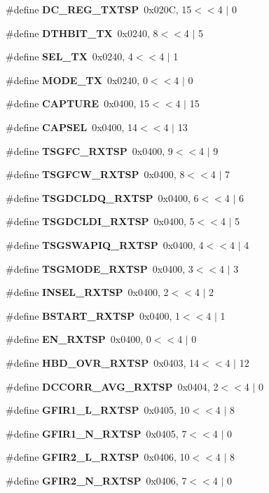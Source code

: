 \begin{DoxyCompactItemize}
\item 
\#define {\bf D\+C\+\_\+\+R\+E\+G\+\_\+\+T\+X\+T\+SP}~0x020\+C, 15$<$$<$4 $\vert$  0
\item 
\#define {\bf D\+T\+H\+B\+I\+T\+\_\+\+TX}~0x0240, 8$<$$<$4 $\vert$  5
\item 
\#define {\bf S\+E\+L\+\_\+\+TX}~0x0240, 4$<$$<$4 $\vert$  1
\item 
\#define {\bf M\+O\+D\+E\+\_\+\+TX}~0x0240, 0$<$$<$4 $\vert$  0
\item 
\#define {\bf C\+A\+P\+T\+U\+RE}~0x0400, 15$<$$<$4 $\vert$  15
\item 
\#define {\bf C\+A\+P\+S\+EL}~0x0400, 14$<$$<$4 $\vert$  13
\item 
\#define {\bf T\+S\+G\+F\+C\+\_\+\+R\+X\+T\+SP}~0x0400, 9$<$$<$4 $\vert$  9
\item 
\#define {\bf T\+S\+G\+F\+C\+W\+\_\+\+R\+X\+T\+SP}~0x0400, 8$<$$<$4 $\vert$  7
\item 
\#define {\bf T\+S\+G\+D\+C\+L\+D\+Q\+\_\+\+R\+X\+T\+SP}~0x0400, 6$<$$<$4 $\vert$  6
\item 
\#define {\bf T\+S\+G\+D\+C\+L\+D\+I\+\_\+\+R\+X\+T\+SP}~0x0400, 5$<$$<$4 $\vert$  5
\item 
\#define {\bf T\+S\+G\+S\+W\+A\+P\+I\+Q\+\_\+\+R\+X\+T\+SP}~0x0400, 4$<$$<$4 $\vert$  4
\item 
\#define {\bf T\+S\+G\+M\+O\+D\+E\+\_\+\+R\+X\+T\+SP}~0x0400, 3$<$$<$4 $\vert$  3
\item 
\#define {\bf I\+N\+S\+E\+L\+\_\+\+R\+X\+T\+SP}~0x0400, 2$<$$<$4 $\vert$  2
\item 
\#define {\bf B\+S\+T\+A\+R\+T\+\_\+\+R\+X\+T\+SP}~0x0400, 1$<$$<$4 $\vert$  1
\item 
\#define {\bf E\+N\+\_\+\+R\+X\+T\+SP}~0x0400, 0$<$$<$4 $\vert$  0
\item 
\#define {\bf H\+B\+D\+\_\+\+O\+V\+R\+\_\+\+R\+X\+T\+SP}~0x0403, 14$<$$<$4 $\vert$  12
\item 
\#define {\bf D\+C\+C\+O\+R\+R\+\_\+\+A\+V\+G\+\_\+\+R\+X\+T\+SP}~0x0404, 2$<$$<$4 $\vert$  0
\item 
\#define {\bf G\+F\+I\+R1\+\_\+\+L\+\_\+\+R\+X\+T\+SP}~0x0405, 10$<$$<$4 $\vert$  8
\item 
\#define {\bf G\+F\+I\+R1\+\_\+\+N\+\_\+\+R\+X\+T\+SP}~0x0405, 7$<$$<$4 $\vert$  0
\item 
\#define {\bf G\+F\+I\+R2\+\_\+\+L\+\_\+\+R\+X\+T\+SP}~0x0406, 10$<$$<$4 $\vert$  8
\item 
\#define {\bf G\+F\+I\+R2\+\_\+\+N\+\_\+\+R\+X\+T\+SP}~0x0406, 7$<$$<$4 $\vert$  0
$$
\end{DoxyCompactItemize}
